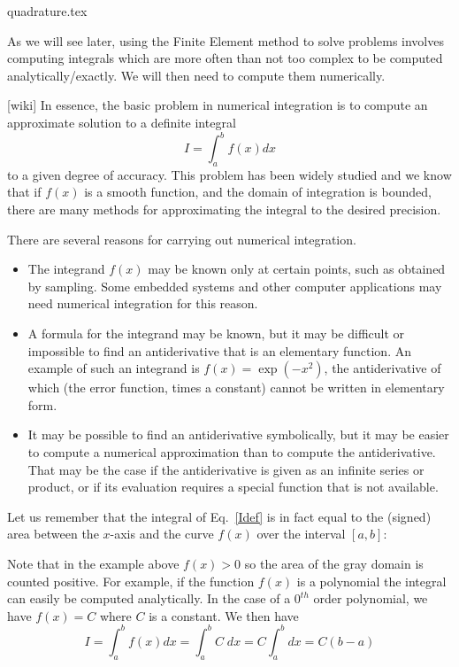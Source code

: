\begin{flushright} {\tiny {\color{gray} quadrature.tex}} \end{flushright}

As we will see later, using the Finite Element method to solve problems involves 
computing integrals which are more often than not too complex to be computed 
analytically/exactly. We will then need to compute them numerically.

[wiki] In essence, 
the basic problem in numerical integration is to compute an approximate solution to a definite integral
\begin{equation}
I=\int_a^b f(x) dx
\label{Idef}
\end{equation}
to a given degree of accuracy.
This problem has been widely studied and we know that 
if $f(x)$ is a smooth function, and the domain of integration is bounded, 
there are many methods for approximating the integral to the desired precision.

There are several reasons for carrying out numerical integration.
\begin{itemize}
\item The integrand $f(x)$ may be known only at certain points, such as obtained by sampling. 
Some embedded systems and other computer applications may need numerical integration for this reason.
\item A formula for the integrand may be known, but it may be difficult or impossible to 
find an antiderivative that is an elementary function. An example of such an integrand 
is $f(x)=\exp(-x^2)$, the antiderivative of which (the error function, times a constant) 
cannot be written in elementary form.
\item It may be possible to find an antiderivative symbolically, but it may be 
easier to compute a numerical approximation than to compute the antiderivative. That may be the 
case if the antiderivative is given as an infinite series or product, or if its evaluation 
requires a special function that is not available.
\end{itemize}

Let us remember that the integral of Eq.~\eqref{Idef} is in fact equal to the (signed) area 
between the $x$-axis and the curve $f(x)$ over the interval $[a,b]$:



Note that in the example above $f(x)>0$ so the area of the gray domain is counted positive.
For example, if the function $f(x)$ is a polynomial the integral can easily be computed 
analytically. In the case of a $0^{th}$ order polynomial, we have $f(x)=C$ where $C$ is a 
constant. We then have 
\begin{equation}
I=\int_a^b f(x) dx = \int_a^b C \; dx  = C \int_a^b dx = C(b-a)
\end{equation}

